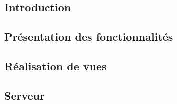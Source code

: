 

\subsection{Introduction}


\subsection{Présentation des fonctionnalités}




\subsection{Réalisation de vues}


\subsection{Serveur}

